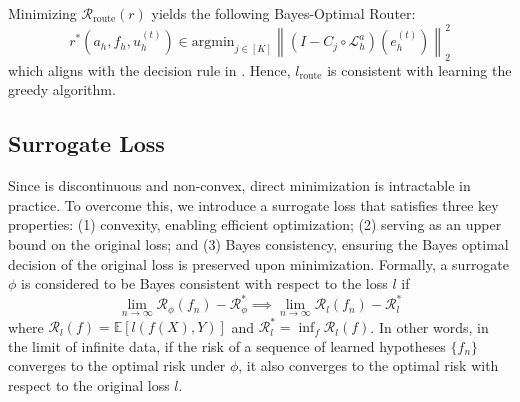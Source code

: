 \documentclass{article} %
\begin{document}

Minimizing $\mathcal{R}_{\text{route}}\left(r\right)$ yields the following Bayes-Optimal Router:
\begin{equation}\label{eq:bayesoptimalrouter}
    r^*(a_h, f_h, u^{(t)}_h) \in \text{argmin}_{j \in [K]} \left\|\left( I - C_{j} \circ \mathcal{L}_{h}^a\right)\left(e^{(t)}_h\right)\right\|^2_2
\end{equation} 
which aligns with the decision rule in . Hence, $l_{\text{route}}$ is consistent with learning the greedy algorithm.

\subsection{Surrogate Loss}

Since  is discontinuous and non-convex, direct minimization is intractable in practice. To overcome this, we introduce a surrogate loss that satisfies three key properties: (1) convexity, enabling efficient optimization; (2) serving as an upper bound on the original loss; and (3) Bayes consistency, ensuring the Bayes optimal decision of the original loss is preserved upon minimization. Formally, a surrogate $\phi$ is considered to be Bayes consistent with respect to the loss $l$ if 
\begin{equation*}
    \lim_{n \to \infty} \mathcal{R}_{\phi}(f_n) - \mathcal{R}_{\phi}^* \implies \lim_{n \to \infty} \mathcal{R}_{l}(f_n) - \mathcal{R}_{l}^* 
\end{equation*}
where $\mathcal{R}_{l}(f) = \mathbb{E}\left[l(f(X), Y)\right]$ and $\mathcal{R}_{l}^* = \inf_f\mathcal{R}_{l}(f)$. In other words, in the limit of infinite data, if the risk of a sequence of learned hypotheses $\{f_n\}$ converges to the optimal risk under $\phi$, it also converges to the optimal risk with respect to the original loss $l$.
\end{document}
